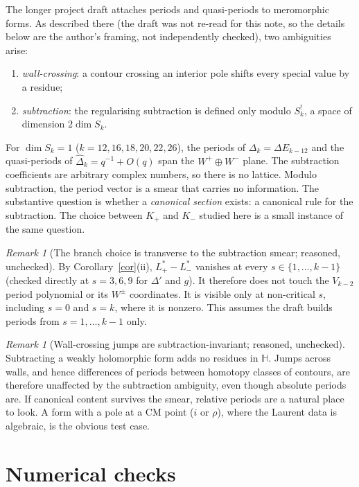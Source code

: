 \documentclass[11pt]{article}
\theoremstyle{definition}
\theoremstyle{remark}
\newtheorem{remark}[theorem]{Remark}
\newcommand{\HH}{\mathbb{H}}
\begin{document}
The longer project draft attaches periods and quasi-periods to meromorphic forms. As
described there (the draft was not re-read for this note, so the details below are the
author's framing, not independently checked), two ambiguities arise:
\begin{enumerate}
\item[(a)] \emph{wall-crossing}: a contour crossing an interior pole shifts every special value
by a residue;
\item[(b)] \emph{subtraction}: the regularising subtraction is defined only modulo $S^!_k$,
a space of dimension $2\dim S_k$.
\end{enumerate}
For $\dim S_k=1$ ($k=12,16,18,20,22,26$), the periods of $\Delta_k=\Delta E_{k-12}$ and the
quasi-periods of $\hat\Delta_k=q^{-1}+O(q)$ span the $W^+\oplus W^-$ plane. The subtraction
coefficients are arbitrary complex numbers, so there is no lattice. Modulo subtraction,
the period vector is a smear that carries no information. The substantive question is
whether a \emph{canonical section} exists: a canonical rule for the subtraction. The choice
between $K_+$ and $K_-$ studied here is a small instance of the same question.

\begin{remark}[The branch choice is transverse to the subtraction smear; reasoned, unchecked]
By Corollary~\ref{cor}(ii), $L^*_+-L^*_-$ vanishes at every $s\in\{1,\dots,k-1\}$ (checked directly at
$s=3,6,9$ for $\Delta'$ and $g$). It therefore does not touch the $V_{k-2}$ period polynomial or
its $W^\pm$ coordinates. It is visible only at non-critical $s$, including $s=0$ and $s=k$,
where it is nonzero. This assumes the draft builds periods from $s=1,\dots,k-1$ only.
\end{remark}

\begin{remark}[Wall-crossing jumps are subtraction-invariant; reasoned, unchecked]
Subtracting a weakly holomorphic form adds no residues in $\HH$. Jumps across walls, and
hence differences of periods between homotopy classes of contours, are therefore
unaffected by the subtraction ambiguity, even though absolute periods are. If canonical
content survives the smear, relative periods are a natural place to look. A form with a
pole at a CM point ($i$ or $\rho$), where the Laurent data is algebraic, is the obvious test case.
\end{remark}

\section{Numerical checks}
\end{document}
